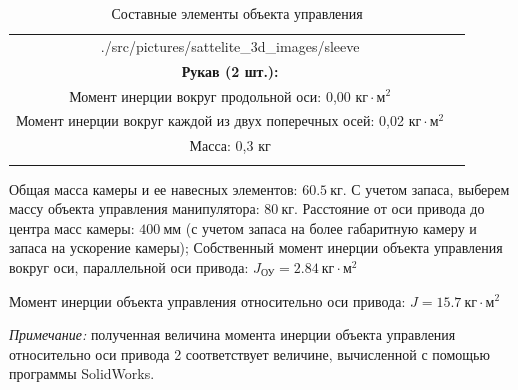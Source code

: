 \begin{table}[ht!]
\begin{tabular}{|c|c|}
                            {./src/pictures/sattelite_3d_images/sleeve} &
            \shortstack[l] {
                \rule{0pt}{2mm} \\
                \textbf{Рукав (2 шт.):} \\
                Момент инерции вокруг продольной оси: 0,00 $\text{кг} \cdot \text{м}^{2}$ \\
                Момент инерции вокруг каждой из двух поперечных  осей: 0,02 $\text{кг} \cdot \text{м}^{2}$ \\
                Масса: 0,3 кг \\
                \rule{0pt}{2mm}
            } \\
        \hline
    \end{tabular}

    \caption{Составные элементы объекта управления}
\end{table}

Общая масса камеры и ее навесных элементов: $60.5 ~\text{кг}$. С учетом запаса, выберем
массу объекта управления манипулятора: $80 ~\text{кг}$.
Расстояние от оси привода до центра масс камеры: $400 ~\text{мм}$ (с учетом запаса
на более габаритную камеру и запаса на ускорение камеры);
Собственный момент инерции объекта управления вокруг оси, параллельной оси привода:
$ J_{\text{ОУ}} = 2.84 ~\text{кг} \cdot \text{м}^2 $

Момент инерции объекта управления относительно оси привода:
$ J = 15.7 ~\text{кг} \cdot \text{м}^2 $

\textit{Примечание:} полученная величина момента инерции объекта управления относительно
оси привода 2 соответствует величине, вычисленной с помощью программы SolidWorks.



\endinput

